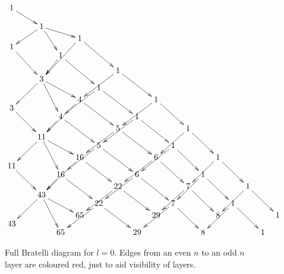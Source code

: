 \begin{figure} 
\[
\xymatrix@R=-2pt@C=7pt{
1 \ar@[red][ddddrr] \\ \mbox{ } \vspace{.1in} \; \\ \\ \\ 
&& 1 \ar[dddll] \ar[ddrr] \ar[ddddr] \\ \\ 
 &&&& 1 \ar@[red][ddddddll] \ar@[red][dddddrr] \\
1 \ar@[red][dddddrr] \\
 &&& 1 \ar@[red][ddddl] \ar@[red][dddddrr] \\ \\ \\ 
 &&&&&&1 \ar[ddddrr] \ar[ddddll] \\
 &&3 \ar[ddddll] \ar[dddrr] \ar[dddddr] \\ 
 &&&&&1 \ar[ddddrr] \ar[ddddll] \\ \\ 
 &&&&4 \ar@[red][dddddll] \ar@[red][ddddrr] &&&& 1 \ar@[red][ddddrr] \ar@[red][ddddll] \\
 3 \ar@[red][ddddrr] \\
 &&& 4 \ar@[red][dddl] \ar@[red][ddddrr] &&&& 1 \ar@[red][ddddrr] \ar@[red][ddddll] \\ 
 \\ 
 &&&&&&5 \ar[ddddrr] \ar[ddddll] &&&& 1 \ar[ddddrr] \ar[ddddll] \\
&& 11 \ar[ddddll] \ar[dddrr] \ar[dddddr] \\  
&&&&& 5 \ar[ddddrr] \ar[ddddll] &&&& 1 \ar[ddddrr] \ar[ddddll] \\ 
\\ 
&&&& 16 \ar@[red][dddddll] \ar@[red][ddddrr] &&&& 6 \ar@[red][ddddrr] \ar@[red][ddddll] &&&& 1 \ar@[red][ddddrr] \ar@[red][ddddll] \\
11 \ar@[red][ddddrr] \\
&&& 16 \ar@[red][dddl] \ar@[red][ddddrr] &&&& 6 \ar@[red][ddddrr] \ar@[red][ddddll] &&&& 1 \ar@[red][ddddrr] \ar@[red][ddddll] \\ 
\\ 
 &&&&&& 22 \ar[ddddrr] \ar[ddddll] &&&& 7 \ar[ddddrr] \ar[ddddll] &&&& 1 \ar[ddddll] \ar[ddddrr] \\
&& 43 \ar[ddddll] \ar[dddrr] \ar[dddddr] \\  
&&&&&  22 \ar[ddddrr] \ar[ddddll] &&&& 7 \ar[ddddrr] \ar[ddddll] &&&& 1 \ar[ddddll] \ar[ddddrr] \\ 
\\ 
&&&& 65 &&&& 29 &&&& 8 &&&& 1 \\
43 \\
&&& 65 &&&& 29 &&&& 8 &&&& 1 \\
}
\]
\caption{ Full Bratelli diagram for $l=0$. Edges from an even $n$ to an odd $n$ layer are coloured red, just to aid visibility of layers. \label{fig:l=0Brat} }
\end{figure} 


